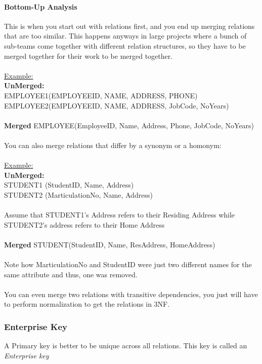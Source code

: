 \documentclass[12pt]{article}
\begin{document}
\paragraph{Bottom-Up Analysis} This is when you start out with relations first, and you end up merging relations that are too similar. This happens anyways in large projects where a bunch of sub-teams come together with different relation structures, so they have to be merged together for their work to be merged together.\\
\\
\underline{Example:}\\
\textbf{UnMerged:}\\
EMPLOYEE1(EMPLOYEEID, NAME, ADDRESS, PHONE)\\
EMPLOYEE2(EMPLOYEEID, NAME, ADDRESS, JobCode, NoYears)\\
\\
\textbf{Merged}
EMPLOYEE(EmployeeID, Name, Address, Phone, JobCode, NoYears)
\\
\\
You can also merge relations that differ by a synonym or a homonym:\\
\\
\underline{Example:}\\
\textbf{UnMerged:}\\
STUDENT1 (StudentID, Name, Address)\\
STUDENT2 (MarticulationNo, Name, Address)\\
\\
Assume that STUDENT1's Address refers to their Residing Address while STUDENT2's address refers to their Home Address\\
\\
\textbf{Merged}
STUDENT(StudentID, Name, ResAddress, HomeAddress)
\\
\\
Note how MarticulationNo and StudentID were just two different names for the same attribute and thus, one was removed.\\
\\
You can even merge two relations with transitive dependencies, you just will have to perform normalization to get the relations in 3NF.

\subsubsection{Enterprise Key}

A Primary key is better to be unique across all relations. This key is called an \textit{Enterprise key}
\end{document}
